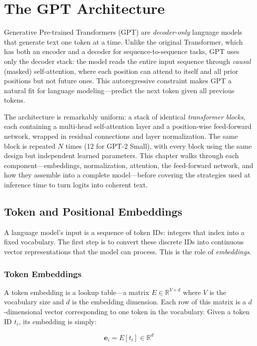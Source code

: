 \chapter{The GPT Architecture}

Generative Pre-trained Transformers (GPT) are \emph{decoder-only} language models
that generate text one token at a time. Unlike the original Transformer, which
has both an encoder and a decoder for sequence-to-sequence tasks, GPT uses only
the decoder stack: the model reads the entire input sequence through
\emph{causal} (masked) self-attention, where each position can attend to itself
and all prior positions but not future ones. This autoregressive constraint makes
GPT a natural fit for language modeling---predict the next token given all
previous tokens.

The architecture is remarkably uniform: a stack of identical \emph{transformer
blocks}, each containing a multi-head self-attention layer and a position-wise
feed-forward network, wrapped in residual connections and layer normalization.
The same block is repeated $N$ times (12 for GPT-2 Small), with every block
using the same design but independent learned parameters. This chapter walks
through each component---embeddings, normalization, attention, the feed-forward
network, and how they assemble into a complete model---before covering the
strategies used at inference time to turn logits into coherent text.

\section{Token and Positional Embeddings}

A language model's input is a sequence of token IDs: integers that index into a
fixed vocabulary. The first step is to convert these discrete IDs into
continuous vector representations that the model can process. This is the role
of \emph{embeddings}.

\subsection{Token Embeddings}

A token embedding is a lookup table---a matrix $E \in \mathbb{R}^{V \times d}$
where $V$ is the vocabulary size and $d$ is the embedding dimension. Each row
of this matrix is a $d$-dimensional vector corresponding to one token in the
vocabulary. Given a token ID $t_i$, its embedding is simply:

\[
  \mathbf{e}_i = E[t_i] \in \mathbb{R}^{d}
\]

